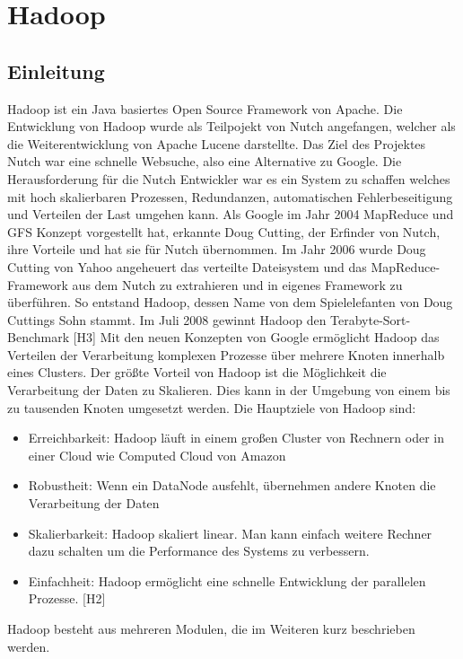 \usepackage{graphicx}
\section{Hadoop}
\cite{Wartal2012}
\cite{Endlich2011}
\subsection{Einleitung}
Hadoop ist ein Java basiertes Open Source Framework von Apache. 
Die Entwicklung von Hadoop wurde als Teilpojekt von Nutch angefangen, welcher als die  Weiterentwicklung von Apache Lucene darstellte. Das Ziel des Projektes Nutch war eine schnelle Websuche, also eine Alternative zu Google. Die Herausforderung für die Nutch Entwickler war es ein System zu schaffen welches mit hoch skalierbaren Prozessen, Redundanzen, automatischen Fehlerbeseitigung und Verteilen der Last umgehen kann.  Als Google im Jahr 2004 MapReduce und GFS Konzept vorgestellt hat, erkannte Doug Cutting, der Erfinder von Nutch, ihre Vorteile und hat sie für Nutch  übernommen. Im Jahr 2006 wurde Doug Cutting von Yahoo angeheuert das verteilte Dateisystem und das MapReduce-Framework aus dem Nutch zu extrahieren und in eigenes Framework zu überführen. So entstand Hadoop, dessen Name von dem Spielelefanten von Doug Cuttings Sohn stammt. Im Juli 2008 gewinnt Hadoop den Terabyte-Sort-Benchmark [H3]
Mit den neuen Konzepten von Google ermöglicht Hadoop das Verteilen der Verarbeitung komplexen Prozesse über mehrere Knoten innerhalb eines Clusters. Der größte Vorteil von Hadoop ist die Möglichkeit die  Verarbeitung der Daten zu Skalieren. Dies kann in der Umgebung von einem bis zu tausenden Knoten umgesetzt werden.
Die Hauptziele von Hadoop sind:
\begin{itemize}
\item Erreichbarkeit: Hadoop läuft in einem großen Cluster von Rechnern oder in einer Cloud wie Computed Cloud von Amazon
\item Robustheit: Wenn ein DataNode ausfehlt, übernehmen andere Knoten die Verarbeitung der Daten
\item Skalierbarkeit: Hadoop skaliert linear. Man kann einfach weitere Rechner dazu schalten um die Performance des Systems zu verbessern.
\item Einfachheit: Hadoop ermöglicht eine schnelle Entwicklung der parallelen Prozesse.
[H2]
\end{itemize}
Hadoop besteht aus mehreren Modulen, die im Weiteren kurz beschrieben werden.
